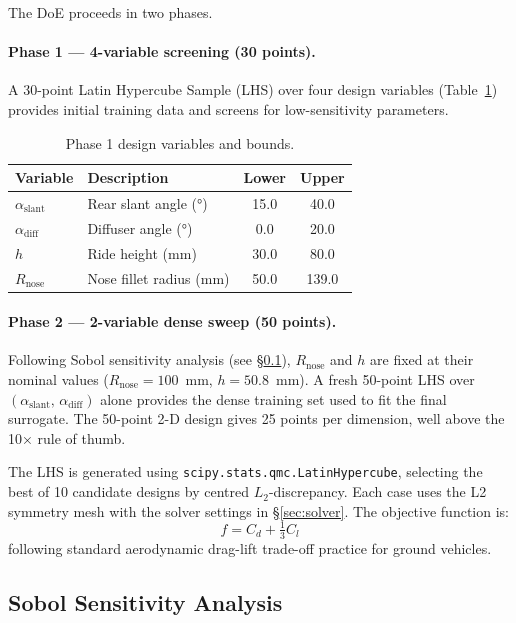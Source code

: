 The DoE proceeds in two phases.

\paragraph{Phase 1 — 4-variable screening (30 points).}
A 30-point Latin Hypercube Sample (LHS) over four design variables (Table~\ref{tab:design_variables_phase1}) provides initial training data and screens for low-sensitivity parameters.

\begin{table}[h]
    \centering
    \caption{Phase 1 design variables and bounds.}
    \label{tab:design_variables_phase1}
    \begin{tabular}{llcc}
        \toprule
        Variable & Description & Lower & Upper \\
        \midrule
        $\alpha_\mathrm{slant}$ & Rear slant angle (°)     & 15.0 & 40.0 \\
        $\alpha_\mathrm{diff}$  & Diffuser angle (°)        &  0.0 & 20.0 \\
        $h$                     & Ride height (mm)           & 30.0 & 80.0 \\
        $R_\mathrm{nose}$       & Nose fillet radius (mm)    & 50.0 & 139.0 \\
        \bottomrule
    \end{tabular}
\end{table}

\paragraph{Phase 2 — 2-variable dense sweep (50 points).}
Following Sobol sensitivity analysis (see \S\ref{sec:sobol}), $R_\mathrm{nose}$ and $h$ are fixed at their nominal values ($R_\mathrm{nose}=100$~mm, $h=50.8$~mm). A fresh 50-point LHS over $(\alpha_\mathrm{slant},\, \alpha_\mathrm{diff})$ alone provides the dense training set used to fit the final surrogate. The 50-point 2-D design gives 25 points per dimension, well above the 10× rule of thumb.

The LHS is generated using \texttt{scipy.stats.qmc.LatinHypercube}, selecting the best of 10 candidate designs by centred $L_2$-discrepancy. Each case uses the L2 symmetry mesh with the solver settings in \S\ref{sec:solver}. The objective function is:
\[
    f = C_d + \tfrac{1}{3} C_l
\]
following standard aerodynamic drag-lift trade-off practice for ground vehicles.

\subsection{Sobol Sensitivity Analysis}
\label{sec:sobol}


